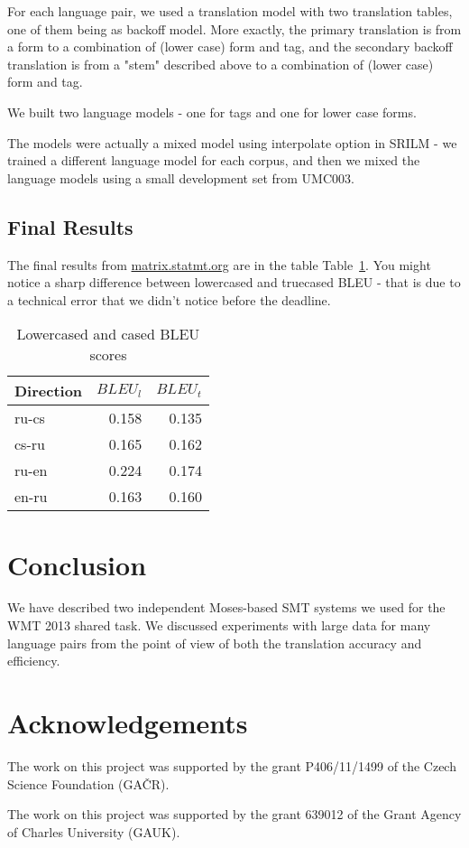 \documentclass[11pt,letterpaper]{article}
\def\Tref#1{Table~\ref{#1}}
\begin{document}
For each language pair, we used a translation model with two translation tables, one of them being as backoff model. More exactly, the primary translation is from a form to a combination of (lower case) form and tag, and the secondary backoff translation is from a "stem" described above to a combination of (lower case) form and tag.

We built two language models - one for tags and one for lower case forms.

The models were actually a mixed model using interpolate option in SRILM - we trained a different language model for each corpus, and then we mixed the language models using a small development set from UMC003.


\subsection{Final Results}

The final results from  \url{matrix.statmt.org} are in the table \Tref{tab:finalbleukarel}. You might notice a sharp difference between lowercased and truecased BLEU - that is due to a technical error that we didn't notice before the deadline. %

\begin{table}[htbl]
\begin{center}
\begin{tabular}{l | r r}
Direction & $BLEU_l$ & $BLEU_t$ \\
\hline
ru-cs & 0.158 & 0.135 \\
cs-ru & 0.165 & 0.162 \\
ru-en & 0.224 & 0.174 \\
en-ru & 0.163 & 0.160 \\
\end{tabular}
\end{center}
\caption{Lowercased and cased BLEU scores}
\label{tab:finalbleukarel}
\end{table}

\section{Conclusion}
\label{sec:concl}

We have described two independent Moses-based SMT systems we used for the WMT 2013 shared task. We discussed experiments with large data for many language pairs from the point of view of both the translation accuracy and efficiency.

\section*{Acknowledgements}
\label{sec:ack}

The work on this project was supported by the grant
P406/11/1499 of the Czech Science Foundation (GAČR).

The work on this project was supported by the grant
639012 of the Grant Agency of Charles University (GAUK).




\end{document}
